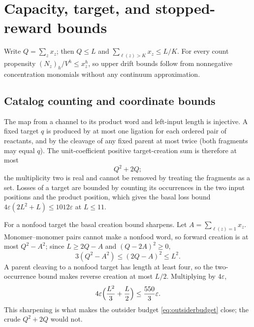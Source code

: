 \documentclass[11pt,letterpaper]{article}
\theoremstyle{plain}
\theoremstyle{definition}
\theoremstyle{remark}
\numberwithin{equation}{section}
\newcommand{\eps}{\varepsilon}
\begin{document}
\appendix
\section{Capacity, target, and stopped-reward bounds}\label{app:bounds}

Write $Q=\sum_zx_z$; then $Q\le L$ and $\sum_{\ell(z)>K}x_z\le L/K$. For every count propensity $(N_z)_h/V^h\le x_z^h$, so upper drift bounds follow from nonnegative concentration monomials without any continuum approximation.

\subsection{Catalog counting and coordinate bounds}\label{app:catalog}
The map from a channel to its product word and left-input length is injective. A fixed target $q$ is produced by at most one ligation for each ordered pair of reactants, and by the cleavage of any fixed parent at most twice (both fragments may equal $q$). The unit-coefficient positive target-creation sum is therefore at most
\begin{equation}\label{eq:creation}
 Q^2+2Q ;
\end{equation}
the multiplicity two is real and cannot be removed by treating the fragments as a set. Losses of a target are bounded by counting its occurrences in the two input positions and the product position, which gives the basal loss bound $4\eps(2L^2+L)\le1012\eps$ at $L\le11$.

For a nonfood target the basal creation bound sharpens. Let $A=\sum_{\ell(z)=1}x_z$. Monomer--monomer pairs cannot make a nonfood word, so forward creation is at most $Q^2-A^2$; since $L\ge2Q-A$ and $(Q-2A)^2\ge0$,
\[
 3(Q^2-A^2)\le(2Q-A)^2\le L^2 .
\]
A parent cleaving to a nonfood target has length at least four, so the two-occurrence bound makes reverse creation at most $L/2$. Multiplying by $4\eps$,
\begin{equation}\label{eq:nonfoodcreation}
 4\eps\Bigl(\frac{L^2}3+\frac L2\Bigr)\le\frac{550}3\eps .
\end{equation}
This sharpening is what makes the outsider budget \eqref{eq:outsiderbudget} close; the crude $Q^2+2Q$ would not.
\end{document}
